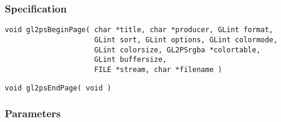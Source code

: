 \documentclass[10pt]{article}
\begin{document}
\subsubsection{Specification}

\begin{verbatim}
void gl2psBeginPage( char *title, char *producer, GLint format,
                     GLint sort, GLint options, GLint colormode,
                     GLint colorsize, GL2PSrgba *colortable,
                     GLint buffersize,
                     FILE *stream, char *filename )
\end{verbatim}

\begin{verbatim}
void gl2psEndPage( void )
\end{verbatim}

\subsubsection{Parameters}
\end{document}
